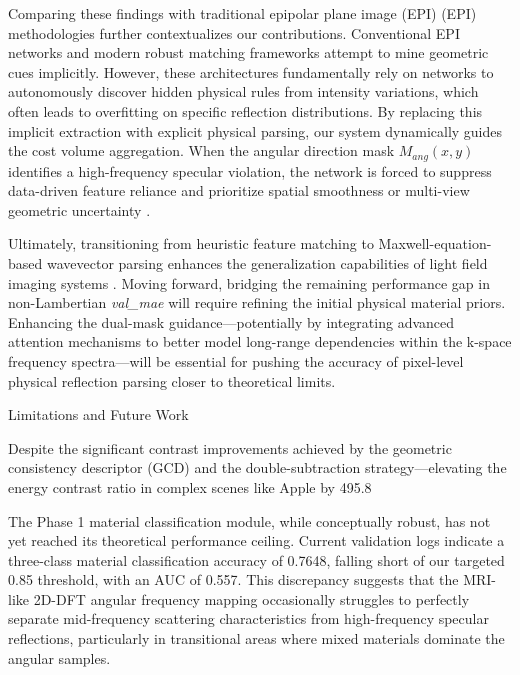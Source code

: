 \documentclass[lettersize,journal]{IEEEtran}
\begin{document}
Comparing these findings with traditional epipolar plane image (EPI) (EPI) methodologies further contextualizes our contributions. Conventional EPI networks \cite{heber2018, wanner2014} and modern robust matching frameworks \cite{wang2023} attempt to mine geometric cues implicitly. However, these architectures fundamentally rely on networks to autonomously discover hidden physical rules from intensity variations, which often leads to overfitting on specific reflection distributions. By replacing this implicit extraction with explicit physical parsing, our system dynamically guides the cost volume aggregation. When the angular direction mask $M_{ang}(x,y)$ identifies a high-frequency specular violation, the network is forced to suppress data-driven feature reliance and prioritize spatial smoothness or multi-view geometric uncertainty \cite{chen2017}. 

Ultimately, transitioning from heuristic feature matching to Maxwell-equation-based wavevector parsing enhances the generalization capabilities of light field imaging systems \cite{ng2005, ng2006}. Moving forward, bridging the remaining performance gap in non-Lambertian \textit{val\_mae} will require refining the initial physical material priors. Enhancing the dual-mask guidance—potentially by integrating advanced attention mechanisms \cite{vaswani2017} to better model long-range dependencies within the k-space frequency spectra—will be essential for pushing the accuracy of pixel-level physical reflection parsing closer to theoretical limits.

Limitations and Future Work

Despite the significant contrast improvements achieved by the geometric consistency descriptor (GCD) and the double-subtraction strategy—elevating the energy contrast ratio in complex scenes like Apple by 495.8%

The Phase 1 material classification module, while conceptually robust, has not yet reached its theoretical performance ceiling. Current validation logs indicate a three-class material classification accuracy of 0.7648, falling short of our targeted 0.85 threshold, with an AUC of 0.557. This discrepancy suggests that the MRI-like 2D-DFT angular frequency mapping occasionally struggles to perfectly separate mid-frequency scattering characteristics from high-frequency specular reflections, particularly in transitional areas where mixed materials dominate the angular samples.
\end{document}
